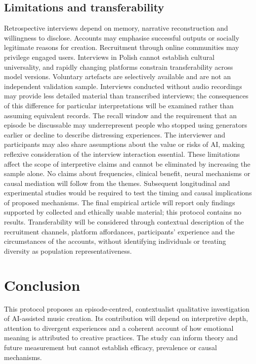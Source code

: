 \documentclass[11pt,a4paper]{article}
\begin{document}
\subsection{Limitations and transferability}
Retrospective interviews depend on memory, narrative reconstruction and willingness to disclose. Accounts may emphasise successful outputs or socially legitimate reasons for creation. Recruitment through online communities may privilege engaged users. Interviews in Polish cannot establish cultural universality, and rapidly changing platforms constrain transferability across model versions. Voluntary artefacts are selectively available and are not an independent validation sample. Interviews conducted without audio recordings may provide less detailed material than transcribed interviews; the consequences of this difference for particular interpretations will be examined rather than assuming equivalent records. The recall window and the requirement that an episode be discussable may underrepresent people who stopped using generators earlier or decline to describe distressing experiences. The interviewer and participants may also share assumptions about the value or risks of AI, making reflexive consideration of the interview interaction essential. These limitations affect the scope of interpretive claims and cannot be eliminated by increasing the sample alone. No claims about frequencies, clinical benefit, neural mechanisms or causal mediation will follow from the themes. Subsequent longitudinal and experimental studies would be required to test the timing and causal implications of proposed mechanisms. The final empirical article will report only findings supported by collected and ethically usable material; this protocol contains no results. Transferability will be considered through contextual description of the recruitment channels, platform affordances, participants' experience and the circumstances of the accounts, without identifying individuals or treating diversity as population representativeness.

\section{Conclusion}
This protocol proposes an episode-centred, contextualist qualitative investigation of AI-assisted music creation. Its contribution will depend on interpretive depth, attention to divergent experiences and a coherent account of how emotional meaning is attributed to creative practices. The study can inform theory and future measurement but cannot establish efficacy, prevalence or causal mechanisms.

\printbibliography
\end{document}
